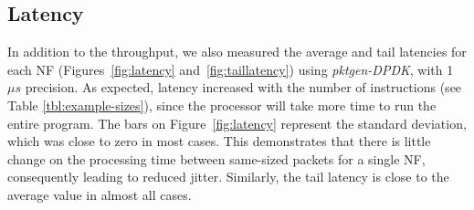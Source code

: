 
\subsection{Latency}

In addition to the throughput, we also measured the average and tail latencies for each NF (Figures~\ref{fig:latency} and~\ref{fig:taillatency}) using \textit{pktgen-DPDK}, with 1 $\mu s$ precision.
As expected, latency increased with the number of instructions (see Table \ref{tbl:example-sizes}), since the processor will take more time to run the entire program. The bars on Figure~\ref{fig:latency} represent the standard deviation, which was close to zero in most cases. This demonstrates that there is little change on the processing time between same-sized packets for a single NF, consequently leading to reduced jitter. Similarly, the tail latency is close to the average value in almost all cases.


